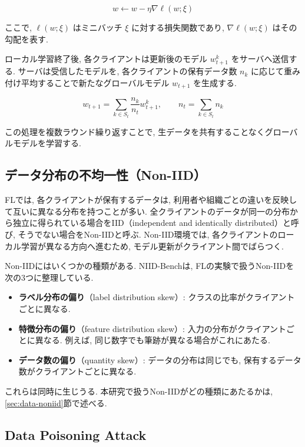 \documentclass[a4j, twocolumn, dvipdfmx]{jsarticle}
\begin{document}
\begin{equation}
w \leftarrow w-\eta\nabla \ell(w;\xi)
\end{equation}

ここで, $\ell(w;\xi)$ はミニバッチ $\xi$ に対する損失関数であり, $\nabla \ell(w;\xi)$ はその勾配を表す.

ローカル学習終了後, 各クライアントは更新後のモデル $w_{t+1}^{k}$ をサーバへ送信する.
サーバは受信したモデルを, 各クライアントの保有データ数 $n_k$ に応じて重み付け平均することで新たなグローバルモデル $w_{t+1}$ を生成する.

\begin{equation}
w_{t+1}
=
\sum_{k \in S_t}
\frac{n_k}{n_t}
w_{t+1}^{k},
\qquad
n_t=\sum_{k\in S_t}n_k
\end{equation}

この処理を複数ラウンド繰り返すことで, 生データを共有することなくグローバルモデルを学習する.

\subsection{データ分布の不均一性（Non-IID）}
\label{sec:noniid}

FLでは, 各クライアントが保有するデータは, 利用者や組織ごとの違いを反映して互いに異なる分布を持つことが多い. 全クライアントのデータが同一の分布から独立に得られている場合をIID（independent and identically distributed）と呼び, そうでない場合をNon-IIDと呼ぶ. Non-IID環境では, 各クライアントのローカル学習が異なる方向へ進むため, モデル更新がクライアント間でばらつく.

Non-IIDにはいくつかの種類がある. NIID-Bench\cite{li2022federated}は, FLの実験で扱うNon-IIDを次の3つに整理している.
\begin{itemize}
  \item \textbf{ラベル分布の偏り}（label distribution skew）: クラスの比率がクライアントごとに異なる.
  \item \textbf{特徴分布の偏り}（feature distribution skew）: 入力の分布がクライアントごとに異なる. 例えば, 同じ数字でも筆跡が異なる場合がこれにあたる.
  \item \textbf{データ数の偏り}（quantity skew）: データの分布は同じでも, 保有するデータ数がクライアントごとに異なる.
\end{itemize}
これらは同時に生じうる. 本研究で扱うNon-IIDがどの種類にあたるかは, \ref{sec:data-noniid}節で述べる.

\subsection{Data Poisoning Attack}
\end{document}
